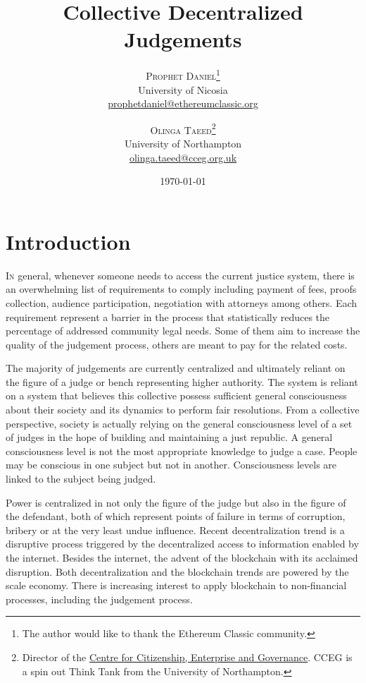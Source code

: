 \documentclass[twoside,twocolumn]{article}
\title{Collective Decentralized Judgements} %
\author{%
\textsc{Prophet Daniel}\thanks{The author would like to thank the Ethereum Classic community.} \\[1ex] %
\normalsize University of Nicosia \\ %
\normalsize \href{mailto:prophetdaniel@ethereumclassic.org}{prophetdaniel@ethereumclassic.org} %
\and %
\textsc{Olinga Taeed}\thanks{Director of the \href{www.cceg.org.uk}{Centre for Citizenship, Enterprise
and Governance}. CCEG is a spin out Think Tank from the University of
Northampton.} \\[1ex] %
\normalsize University of Northampton \\ %
\normalsize \href{mailto:olinga.taeed@cceg.org.uk}{olinga.taeed@cceg.org.uk} %
}
\date{\today} %
\begin{document}
\maketitle


\section{Introduction}

\lettrine[nindent=0em,lines=3]{I}n general, whenever someone needs to access the
current justice system, there is an overwhelming list of requirements to comply
including payment of fees, proofs collection, audience participation,
negotiation with attorneys among others. Each requirement represent a barrier in
the process that statistically reduces the percentage of addressed community
legal needs. Some of them aim to increase the quality of the judgement process,
others are meant to pay for the related costs.


The majority of judgements are currently centralized and ultimately reliant on
the figure of a judge or bench representing higher authority. The system is
reliant on a system that believes this collective possess sufficient general
consciousness about their society and its dynamics to perform fair resolutions.
From a collective perspective, society is actually relying on the general
consciousness level of a set of judges in the hope of building and maintaining a
just republic. A general consciousness level is not the most appropriate
knowledge to judge a case. People may be conscious  in one subject but not in
another. Consciousness levels are linked to the subject being judged\cite{DanielDAGS2016}.

Power is centralized in not only the figure of the judge but also in the figure
of the defendant, both of which represent points of failure in terms of
corruption, bribery or at the very least undue influence. Recent
decentralization trend is a disruptive process triggered by the decentralized
access to information enabled by the internet. Besides the internet, the advent
of the blockchain with its acclaimed disruption. Both decentralization and the
blockchain trends are powered by the scale economy. There is increasing interest
to apply blockchain to non-financial processes, including the judgement
process\cite{AntonopoulosDAMN2016}.
\end{document}
